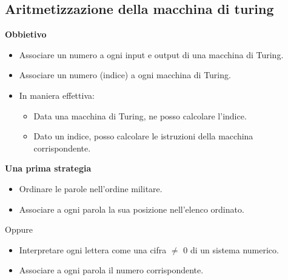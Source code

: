 \subsection{Aritmetizzazione della macchina di turing}
\textbf{Obbietivo}\\
\begin{itemize}
    \item Associare un numero a ogni input e output di una macchina di Turing.
    
    \item Associare un numero (indice) a ogni macchina di Turing.
    
    \item In maniera effettiva:
    
    \begin{itemize}
        \item Data una macchina di Turing, ne posso calcolare l’indice.
        
        \item Dato un indice, posso calcolare le istruzioni della macchina corrispondente.
    \end{itemize}
\end{itemize}
\textbf{Una prima strategia}
\begin{itemize}
    \item Ordinare le parole nell’ordine militare.
    
    \item Associare a ogni parola la sua posizione nell’elenco ordinato.
\end{itemize}

Oppure

\begin{itemize}
    \item Interpretare ogni lettera come una cifra $\neq$ 0 di un sistema numerico.
    
    \item Associare a ogni parola il numero corrispondente.
\end{itemize}


